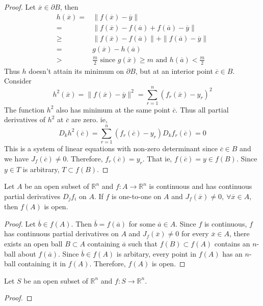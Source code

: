 \begin{proof}
Let $\overline{x} \in \partial B$, then 
\begin{align*}
	h(\overline{x}) = & \| f(\overline{x}) - \overline{y} \| \\
	= &  \| f(\overline{x}) - f(\overline{a}) + f(\overline{a}) - \overline{y} \| \\
	\ge &  \| f(\overline{x}) - f(\overline{a})\| + \| f(\overline{a}) - \overline{y} \| \\ 
	= &  g(\overline{x}) - h(\overline{a}) \\
	> & \frac{m}{2} \text{ since $g(\overline{x}) \ge m$ and $h(\overline{a}) < \frac{m}{2}$}
\end{align*}
	Thus $h$ doesn't attain its minimum on $\partial B$, but at an interior point $\overline{c} \in B$. Consider
	\[ h^2(\overline{x}) = \| f(\overline{x}) - \overline{y}\|^2 = \sum_{r = 1}^n (f_r(\overline{x}) - y_r)^2 \]
	The function $h^2$ also has minimum at the same point $\overline{c}$. Thus all partial derivatives of $h^2$ at $\overline{c}$ are zero. ie, 
	\[ D_k h^2(\overline{c}) = \sum_{r = 1}^n (f_r(\overline{c})-y_r)D_kf_r(\overline{c}) = 0 \]
	This is a system of linear equations with non-zero determinant since $\overline{c} \in B$ and we have $J_f(\overline{c}) \ne 0$. Therefore, $f_r(\overline{c}) = y_r$. That ie, $f(\overline{c}) = y \in f(B)$. Since $y \in T$ is arbitrary, $T \subset f(B)$.
\end{proof}

\begin{theorem}
	Let $A$ be an open subset of $\mathbb{R}^n$ and $f : A \to \mathbb{R}^n$ is continuous and has continuous partial derivatives $D_jf_i$ on $A$. If $f$ is one-to-one on $A$ and $J_f(\overline{x}) \ne 0,\ \forall \overline{x} \in A$, then $f(A)$ is open.
\end{theorem}
\begin{proof}
	Let $\overline{b} \in f(A)$. Then $\overline{b} = f(\overline{a})$ for some $\overline{a} \in A$. Since $f$ is continuous, $f$ has continuous partial derivatives on $A$ and $J_f(\overline{x}) \ne 0$ for every $\overline{x} \in A$, there exists an open ball $B \subset A$ containing $\overline{a}$ such that $f(B) \subset f(A)$ contains an $n$-ball about $f(\overline{a})$. Since $\overline{b} \in f(A)$ is arbitary, every point in $f(A)$ has an $n$-ball containing it in $f(A)$. Therefore, $f(A)$ is open.
\end{proof}

\begin{theorem}
	Let $S$ be an open subset of $\mathbb{R}^n$ and $f : S \to \mathbb{R}^n$.
\end{theorem}
\begin{proof}
\end{proof}

